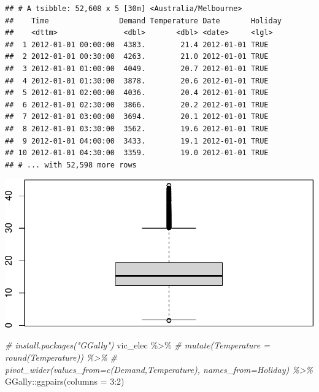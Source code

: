 \documentclass[
]{book}
\newenvironment{Shaded}{\begin{snugshade}}{\end{snugshade}}
\newcommand{\AttributeTok}[1]{\textcolor[rgb]{0.77,0.63,0.00}{#1}}
\newcommand{\CommentTok}[1]{\textcolor[rgb]{0.56,0.35,0.01}{\textit{#1}}}
\newcommand{\DecValTok}[1]{\textcolor[rgb]{0.00,0.00,0.81}{#1}}
\newcommand{\FunctionTok}[1]{\textcolor[rgb]{0.00,0.00,0.00}{#1}}
\newcommand{\NormalTok}[1]{#1}
\newcommand{\SpecialCharTok}[1]{\textcolor[rgb]{0.00,0.00,0.00}{#1}}
\begin{document}
\begin{verbatim}
## # A tsibble: 52,608 x 5 [30m] <Australia/Melbourne>
##    Time                Demand Temperature Date       Holiday
##    <dttm>               <dbl>       <dbl> <date>     <lgl>  
##  1 2012-01-01 00:00:00  4383.        21.4 2012-01-01 TRUE   
##  2 2012-01-01 00:30:00  4263.        21.0 2012-01-01 TRUE   
##  3 2012-01-01 01:00:00  4049.        20.7 2012-01-01 TRUE   
##  4 2012-01-01 01:30:00  3878.        20.6 2012-01-01 TRUE   
##  5 2012-01-01 02:00:00  4036.        20.4 2012-01-01 TRUE   
##  6 2012-01-01 02:30:00  3866.        20.2 2012-01-01 TRUE   
##  7 2012-01-01 03:00:00  3694.        20.1 2012-01-01 TRUE   
##  8 2012-01-01 03:30:00  3562.        19.6 2012-01-01 TRUE   
##  9 2012-01-01 04:00:00  3433.        19.1 2012-01-01 TRUE   
## 10 2012-01-01 04:30:00  3359.        19.0 2012-01-01 TRUE   
## # ... with 52,598 more rows
\end{verbatim}

\begin{Shaded}
\end{Shaded}

\includegraphics{graphics/unnamed-chunk-21-1.pdf}

\begin{Shaded}
\begin{Highlighting}[]
\CommentTok{\# install.packages("GGally")}
\NormalTok{vic\_elec }\SpecialCharTok{\%\textgreater{}\%}
  \CommentTok{\# mutate(Temperature = round(Temperature)) \%\textgreater{}\%}
  \CommentTok{\# pivot\_wider(values\_from=c(Demand,Temperature), names\_from=Holiday) \%\textgreater{}\%}
\NormalTok{  GGally}\SpecialCharTok{::}\FunctionTok{ggpairs}\NormalTok{(}\AttributeTok{columns =} \DecValTok{3}\SpecialCharTok{:}\DecValTok{2}\NormalTok{)}
\end{Highlighting}
\end{Shaded}
\end{document}
